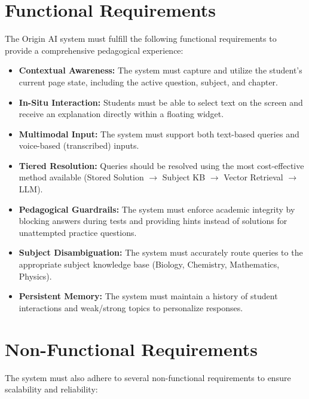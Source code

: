 \section{Functional Requirements}

The Origin AI system must fulfill the following functional requirements to provide a comprehensive pedagogical experience:

\begin{itemize}
    \item \textbf{Contextual Awareness:} The system must capture and utilize the student's current page state, including the active question, subject, and chapter.
    \item \textbf{In-Situ Interaction:} Students must be able to select text on the screen and receive an explanation directly within a floating widget.
    \item \textbf{Multimodal Input:} The system must support both text-based queries and voice-based (transcribed) inputs.
    \item \textbf{Tiered Resolution:} Queries should be resolved using the most cost-effective method available (Stored Solution $\rightarrow$ Subject KB $\rightarrow$ Vector Retrieval $\rightarrow$ LLM).
    \item \textbf{Pedagogical Guardrails:} The system must enforce academic integrity by blocking answers during tests and providing hints instead of solutions for unattempted practice questions.
    \item \textbf{Subject Disambiguation:} The system must accurately route queries to the appropriate subject knowledge base (Biology, Chemistry, Mathematics, Physics).
    \item \textbf{Persistent Memory:} The system must maintain a history of student interactions and weak/strong topics to personalize responses.
\end{itemize}

\section{Non-Functional Requirements}

The system must also adhere to several non-functional requirements to ensure scalability and reliability:

